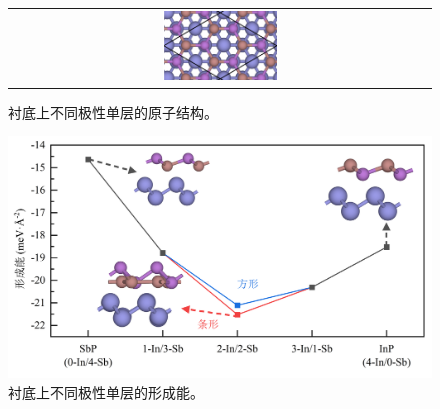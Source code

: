\begin{figure}[htb]
{\begin{tabular}{c}
            \includegraphics[width=0.28\textwidth]{pic/IS_structure_1Linsb_40top.png}
        \end{tabular}
    }
    \caption{衬底上不同极性单层的原子结构。}
    \label{fig:IS_structure_1Linsb_allPolarity}
\end{figure}

\begin{figure}[htb]
    \includegraphics{pic/IS_DFT_1LInSb_all.png}
    \caption{衬底上不同极性单层的形成能。}
    \label{fig:IS_DFT_1LInSb_all}
\end{figure}

